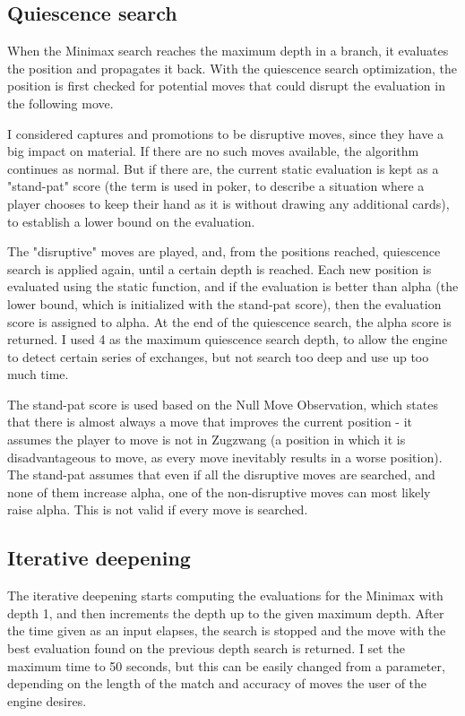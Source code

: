 \subsection{Quiescence search}
\label{subsec:ch4sec2subsec2}

When the Minimax search reaches the maximum depth in a branch, it evaluates the position and propagates it back. With the quiescence search optimization, the position is first checked for potential moves that could disrupt the evaluation in the following move.

I considered captures and promotions to be disruptive moves, since they have a big impact on material. If there are no such moves available, the algorithm continues as normal. But if there are, the current static evaluation is kept as a "stand-pat" score (the term is used in poker, to describe a situation where a player chooses to keep their hand as it is without drawing any additional cards), to establish a lower bound on the evaluation.

The "disruptive" moves are played, and, from the positions reached, quiescence search is applied again, until a certain depth is reached. Each new position is evaluated using the static function, and if the evaluation is better than alpha (the lower bound, which is initialized with the stand-pat score), then the evaluation score is assigned to alpha. At the end of the quiescence search, the alpha score is returned. I used 4 as the maximum quiescence search depth, to allow the engine to detect certain series of exchanges, but not search too deep and use up too much time.

The stand-pat score is used based on the Null Move Observation, which states
that there is almost always a move that improves the current position - it assumes the player to move is not in Zugzwang (a position in which it is disadvantageous to move, as every move inevitably results in a worse position). The stand-pat assumes that even if all the disruptive moves are searched, and none of them increase alpha, one of the non-disruptive moves can most likely raise alpha. This is not valid if every move is searched.

\subsection{Iterative deepening}
\label{subsec:ch4sec2subsec3}

The iterative deepening starts computing the evaluations for the Minimax with depth 1, and then increments the depth up to the given maximum depth. After the time given as an input elapses, the search is stopped and the move with the best evaluation found on the previous depth search is returned. I set the maximum time to 50 seconds, but this can be easily changed from a parameter, depending on the length of the match and accuracy of moves the user of the engine desires.

